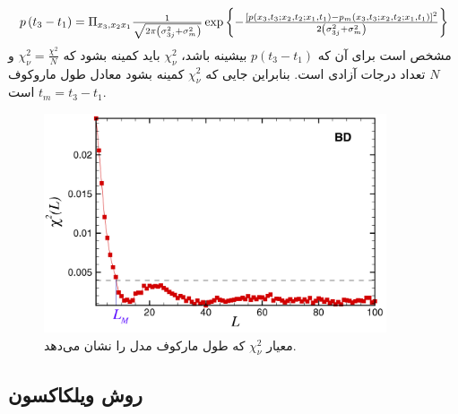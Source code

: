 \begin{equation}
  \resizebox{1\hsize}{!}{$p\left(t_{3}-t_{1}\right) = \Pi_{x_{3}, x_{2} x_{1}} \frac{1}{\sqrt{2 \pi\left(\sigma_{3 j}^{2}+\sigma_{m}^{2}\right)}} \exp \left\{ - \frac{\left[p\left(x_{3}, t_{3} ; x_{2}, t_{2} ; x_{1}, t_{1}\right)-p_{m}\left(x_{3}, t_{3} ; x_{2}, t_{2} ; x_{1}, t_{1}\right)\right]^{2}}{2\left(\sigma_{3 j}^{2}+\sigma_{m}^{2}\right)}\right\}$}
\end{equation}
مشخص است برای آن که $p(t_3 - t_1)$ بیشینه باشد، $\chi^{2}_{\nu}$ باید کمینه بشود که $\chi_{\nu}^{2}=\frac{\chi^{2}}{N}$ و $N$ تعداد درجات آزادی است. بنابراین جایی که $\chi_{\nu}^{2}$ کمینه بشود معادل طول ماروکوف $t_m = t_3 - t_1$ است.\cite{kimiagar_markov_2011, ghasemi_markov_2007,kimiagar_markov_2008,friedrich_note_1998}
\begin{figure}[H]
    \centering
    \includegraphics[width=0.9\textwidth]{images/x_v.png}
    \caption{معیار $\chi^{2}_\nu$ که طول مارکوف مدل  را نشان می‌دهد.\cite{kimiagar_markov_2008}}
  \end{figure}
  \FloatBarrier

\subsection{روش ویلکاکسون}

